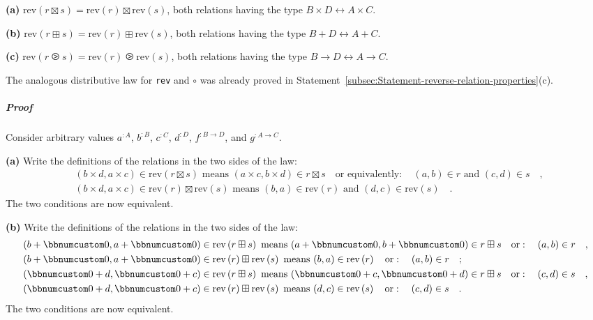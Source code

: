 \textbf{(a)} $\text{rev}\left(r\boxtimes s\right)=\text{rev}\left(r\right)\boxtimes\text{rev}\left(s\right)$,
both relations having the type $B\times D\leftrightarrow A\times C$.

\textbf{(b)} $\text{rev}\left(r\boxplus s\right)=\text{rev}\left(r\right)\boxplus\text{rev}\left(s\right)$,
both relations having the type $B+D\leftrightarrow A+C$.

\textbf{(c)} $\text{rev}\left(r\ogreaterthan s\right)=\text{rev}\left(r\right)\ogreaterthan\text{rev}\left(s\right)$,
both relations having the type $B\rightarrow D\leftrightarrow A\rightarrow C$.

The analogous distributive law for \lstinline!rev! and $\circ$ was
already proved in Statement~\ref{subsec:Statement-reverse-relation-properties}(c).

\subparagraph{Proof}

Consider arbitrary values $a^{:A}$, $b^{:B}$, $c^{:C}$, $d^{:D}$,
$f^{:B\rightarrow D}$, and $g^{:A\rightarrow C}$.

\textbf{(a)} Write the definitions of the relations in the two sides
of the law:
\begin{align*}
 & (b\times d,a\times c)\in\text{rev}\left(r\boxtimes s\right)\text{ means }(a\times c,b\times d)\in r\boxtimes s\quad\text{or equivalently}:\quad(a,b)\in r\text{ and }(c,d)\in s\quad,\\
 & (b\times d,a\times c)\in\text{rev}\left(r\right)\boxtimes\text{rev}\left(s\right)\text{ means }(b,a)\in\text{rev}\left(r\right)\text{ and }(d,c)\in\text{rev}\left(s\right)\quad.
\end{align*}
The two conditions are now equivalent.

\textbf{(b)} Write the definitions of the relations in the two sides
of the law:
\begin{align*}
 & (b+\bbnum 0,a+\bbnum 0)\in\text{rev}\left(r\boxplus s\right)\text{ means }(a+\bbnum 0,b+\bbnum 0)\in r\boxplus s\quad\text{or}:\quad(a,b)\in r\quad,\\
 & (b+\bbnum 0,a+\bbnum 0)\in\text{rev}\left(r\right)\boxplus\text{rev}\left(s\right)\text{ means }(b,a)\in\text{rev}\left(r\right)\quad\text{or}:\quad(a,b)\in r\quad;\\
 & (\bbnum 0+d,\bbnum 0+c)\in\text{rev}\left(r\boxplus s\right)\text{ means }(\bbnum 0+c,\bbnum 0+d)\in r\boxplus s\quad\text{or}:\quad(c,d)\in s\quad,\\
 & (\bbnum 0+d,\bbnum 0+c)\in\text{rev}\left(r\right)\boxplus\text{rev}\left(s\right)\text{ means }(d,c)\in\text{rev}\left(s\right)\quad\text{or}:\quad(c,d)\in s\quad.
\end{align*}
The two conditions are now equivalent.


